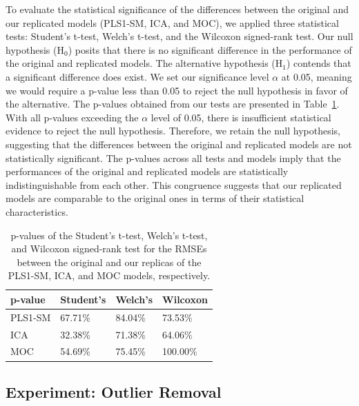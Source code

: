 To evaluate the statistical significance of the differences between the original and our replicated models (PLS1-SM, ICA, and MOC), we applied three statistical tests: Student's t-test, Welch's t-test, and the Wilcoxon signed-rank test.
Our null hypothesis (H$_0$) posits that there is no significant difference in the performance of the original and replicated models.
The alternative hypothesis (H$_1$) contends that a significant difference does exist.
We set our significance level $\alpha$ at 0.05, meaning we would require a p-value less than 0.05 to reject the null hypothesis in favor of the alternative.
The p-values obtained from our tests are presented in Table~\ref{tab:results_ttests}. With all p-values exceeding the $\alpha$ level of 0.05, there is insufficient statistical evidence to reject the null hypothesis.
Therefore, we retain the null hypothesis, suggesting that the differences between the original and replicated models are not statistically significant.
The p-values across all tests and models imply that the performances of the original and replicated models are statistically indistinguishable from each other.
This congruence suggests that our replicated models are comparable to the original ones in terms of their statistical characteristics.

\begin{table}[h]
\centering
\begin{tabular}{llll}
\hline
p-value    & Student's & Welch's & Wilcoxon \\
\hline
PLS1-SM    & 67.71\% & 84.04\% & 73.53\% \\
ICA        & 32.38\% & 71.38\% & 64.06\% \\
MOC        & 54.69\% & 75.45\% & 100.00\% \\
\hline
\end{tabular}
\caption{p-values of the Student's t-test, Welch's t-test, and Wilcoxon signed-rank test for the RMSEs between the original and our replicas of the PLS1-SM, ICA, and MOC models, respectively.}
\label{tab:results_ttests}
\end{table}

\subsection{Experiment: Outlier Removal}\label{sec:experiment_outlier_removal}

